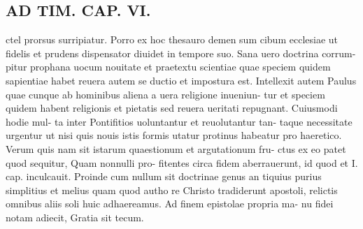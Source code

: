 \documentclass{article}
\begin{document}
\begin{pages}
\section*{AD TIM. CAP. VI. }
\marginpar{[ p.174 ]}\pstart ctel prorsus surripiatur. Porro ex hoc thesauro demen sum cibum ecclesiae ut fidelis et prudens dispensator diuidet in tempore suo. Sana uero doctrina corrum- pitur prophana uocum nouitate et praetextu scientiae quae speciem quidem sapientiae habet reuera autem se ductio et impostura est. Intellexit autem Paulus quae cunque ab hominibus aliena a uera religione inueniun- tur et speciem quidem habent religionis et pietatis sed reuera ueritati repugnant. Cuiusmodi hodie mul- ta inter Pontifitios uoluntantur et reuolutantur tan- taque necessitate urgentur ut nisi quis nouis istis formis utatur protinus habeatur pro haeretico. Verum quis nam sit istarum quaestionum et argutationum fru- ctus ex eo patet quod sequitur, Quam nonnulli pro- fitentes circa fidem aberrauerunt, id quod et I. cap. inculcauit. Proinde cum nullum sit doctrinae genus an tiquius purius simplitius et melius quam quod autho re Christo tradiderunt apostoli, relictis omnibus aliis soli huic adhaereamus. Ad finem epistolae propria ma- nu fidei notam adiecit, Gratia sit tecum.  \pend\pstart  \pend
\endnumbering
\end{pages}
\end{document}
